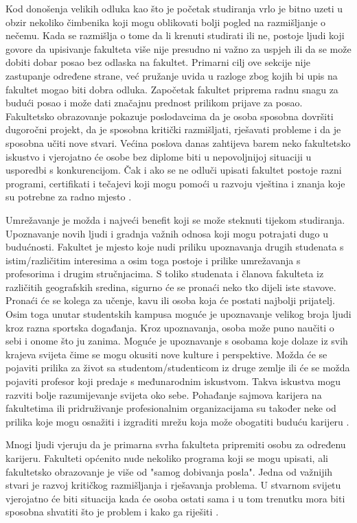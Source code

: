 \documentclass[]{foi}
\begin{document}
Kod donošenja velikih odluka kao što je početak studiranja vrlo je bitno uzeti u obzir nekoliko čimbenika koji mogu oblikovati bolji pogled na razmišljanje o nečemu. Kada se razmišlja o tome da li krenuti
studirati ili ne, postoje ljudi koji govore da upisivanje fakulteta više nije presudno ni važno za uspjeh ili da se može dobiti dobar posao bez odlaska na fakultet.
Primarni cilj ove sekcije nije zastupanje određene strane, već pružanje uvida u razloge zbog kojih bi upis na fakultet mogao biti dobra odluka. Započetak fakultet priprema radnu snagu za budući posao i može
dati značajnu prednost prilikom prijave za posao. Fakultetsko obrazovanje pokazuje poslodavcima da je osoba sposobna dovršiti dugoročni projekt, da je sposobna kritički razmišljati,
rješavati probleme i da je sposobna učiti nove stvari. Većina poslova danas zahtijeva barem neko fakultetsko iskustvo i vjerojatno će osobe bez diplome biti u nepovoljnijoj situaciji u usporedbi
s konkurencijom. Čak i ako se ne odluči upisati fakultet postoje razni programi, certifikati i tečajevi koji mogu pomoći u razvoju vještina i znanja koje su potrebne za radno mjesto
\cite{bisio2025college}.

Umrežavanje je možda i najveći benefit koji se može steknuti tijekom studiranja. Upoznavanje novih ljudi i gradnja važnih odnosa koji mogu potrajati dugo u budućnosti. Fakultet je mjesto koje nudi priliku upoznavanja drugih studenata s istim/različitim interesima a osim toga postoje i prilike umrežavanja s profesorima i drugim stručnjacima.
S toliko studenata i članova fakulteta iz različitih geografskih sredina, sigurno će se pronaći neko tko dijeli iste stavove. Pronaći će se kolega za učenje, kavu ili osoba koja će postati najbolji prijatelj.
Osim toga unutar studentskih kampusa moguće je upoznavanje velikog broja ljudi kroz razna sportska događanja. Kroz upoznavanja, osoba može puno naučiti o sebi i onome što ju zanima.
Moguće je upoznavanje s osobama koje dolaze iz svih krajeva svijeta čime se mogu okusiti nove kulture i perspektive. Možda će se pojaviti prilika za život sa studentom/studenticom iz druge zemlje ili 
će se možda pojaviti profesor koji predaje s međunarodnim iskustvom. Takva iskustva mogu razviti bolje razumijevanje svijeta oko sebe. Pohađanje sajmova karijera na fakultetima ili 
pridruživanje profesionalnim organizacijama su također neke od prilika koje mogu osnažiti i izgraditi mrežu koja može obogatiti buduću karijeru \cite{bisio2025college}.

Mnogi ljudi vjeruju da je primarna svrha fakulteta pripremiti osobu za određenu karijeru. Fakulteti općenito nude nekoliko programa koji se mogu upisati, ali fakultetsko obrazovanje
je više od "samog dobivanja posla". Jedna od važnijih stvari je razvoj kritičkog razmišljanja i rješavanja problema. U stvarnom svijetu vjerojatno će biti situacija kada će osoba ostati
sama i u tom trenutku mora biti sposobna shvatiti što je problem i kako ga riješiti \cite{bisio2025college}. 
\end{document}
